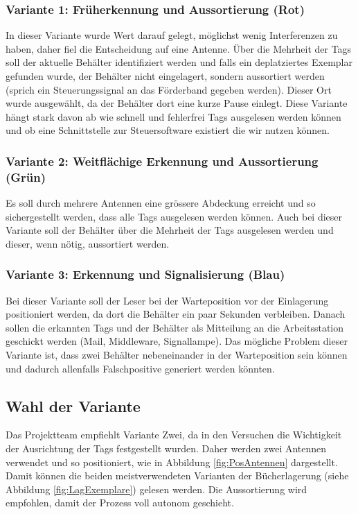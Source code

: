 \subsubsection{Variante 1: Früherkennung und Aussortierung (Rot)}
In dieser Variante wurde Wert darauf gelegt, möglichst wenig Interferenzen zu haben, daher fiel die Entscheidung auf eine Antenne. Über die Mehrheit der Tags soll der aktuelle Behälter identifiziert werden und falls ein deplatziertes Exemplar gefunden wurde, der Behälter nicht eingelagert, sondern aussortiert werden (sprich ein Steuerungssignal an das Förderband gegeben werden). Dieser Ort wurde ausgewählt, da der Behälter dort eine kurze Pause einlegt. Diese Variante hängt stark davon ab wie schnell und fehlerfrei Tags ausgelesen werden können und ob eine Schnittstelle zur Steuersoftware existiert die wir nutzen können.

\subsubsection{Variante 2: Weitflächige Erkennung und Aussortierung (Grün)}
Es soll durch mehrere Antennen eine grössere Abdeckung erreicht und so sichergestellt werden, dass alle Tags ausgelesen werden können. Auch bei dieser Variante soll der Behälter über die Mehrheit der Tags ausgelesen werden und dieser, wenn nötig, aussortiert werden.

\subsubsection{Variante 3: Erkennung und Signalisierung (Blau)}
Bei dieser Variante soll der Leser bei der Warteposition vor der Einlagerung positioniert werden, da dort die Behälter ein paar Sekunden verbleiben. Danach sollen die erkannten Tags und der Behälter als Mitteilung an die Arbeitsstation geschickt werden (Mail, Middleware, Signallampe). Das mögliche Problem dieser Variante ist, dass zwei Behälter nebeneinander in der Warteposition sein können und dadurch allenfalls Falschpositive generiert werden könnten.

\subsection{Wahl der Variante}

Das Projektteam empfiehlt Variante Zwei, da in den Versuchen die Wichtigkeit der Ausrichtung der Tags festgestellt wurden. Daher werden zwei Antennen verwendet und so positioniert, wie in Abbildung \ref{fig:PosAntennen} dargestellt. Damit können die beiden meistverwendeten Varianten der Bücherlagerung (siehe Abbildung \ref{fig:LagExemplare}) gelesen werden. Die Aussortierung wird empfohlen, damit der Prozess voll autonom geschieht.

